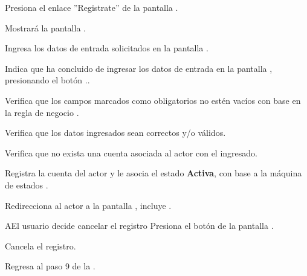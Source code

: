 	\begin{UCtrayectoria}
		\UCpaso[\UCactor] Presiona el enlace ''Registrate'' de la pantalla .
		
		\UCpaso Mostrará la pantalla .
		
		\UCpaso[\UCactor] Ingresa los datos de entrada solicitados en la pantalla .
		
		\UCpaso[\UCactor] Indica que ha concluido de ingresar los datos de entrada en la pantalla , presionando el botón ..
		
		\UCpaso Verifica que los campos marcados como obligatorios no estén vacíos con base en la regla de negocio .
		
		\UCpaso Verifica que los datos ingresados sean correctos y/o válidos.
	
		\UCpaso Verifica que no exista una cuenta asociada al actor con el  ingresado.
		
		\UCpaso Registra la cuenta del actor y le asocia el estado \textbf{Activa}, con base a la máquina de estados .
		
		\UCpaso Redirecciona al actor a la pantalla , incluye .
	\end{UCtrayectoria}

	\begin{UCtrayectoriaA}{A}{El usuario decide cancelar el registro}
		\UCpaso[\UCactor] Presiona el botón  de la pantalla .
		
		\UCpaso Cancela el registro.
		
		\UCpaso Regresa al paso 9 de la .
	\end{UCtrayectoriaA}
	